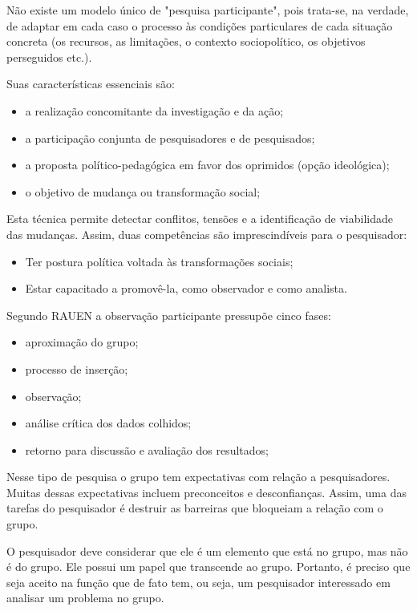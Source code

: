 Não existe um modelo único de "pesquisa participante", pois trata-se, na verdade, de adaptar em cada caso o processo às condições particulares de cada situação concreta (os recursos, as limitações, o contexto sociopolítico, os objetivos perseguidos etc.).

Suas características essenciais são:

\begin{itemize}
	\item a realização concomitante da investigação e da ação;
	\item a participação conjunta de pesquisadores e de pesquisados;
	\item a proposta político-pedagógica em favor dos oprimidos (opção ideológica);
	\item o objetivo de mudança ou transformação social;
\end{itemize}

Esta técnica permite detectar conflitos, tensões e a identificação de viabilidade das mudanças. Assim, duas competências são imprescindíveis para o pesquisador:

\begin{itemize}
	\item Ter postura política voltada às transformações sociais; 
	\item Estar capacitado a promovê-la, como observador e como analista.
\end{itemize}

Segundo RAUEN a observação participante pressupõe cinco fases:

\begin{itemize}
	\item aproximação do grupo;
	\item processo de inserção;
	\item observação;
	\item análise crítica dos dados colhidos;
	\item retorno para discussão e avaliação dos resultados;
\end{itemize}

Nesse tipo de pesquisa o grupo tem expectativas com relação a pesquisadores. Muitas dessas expectativas incluem preconceitos e desconfianças. Assim, uma das tarefas do pesquisador é destruir as barreiras que bloqueiam a relação com o grupo.

O pesquisador deve considerar que ele é um elemento que está no grupo, mas não é do grupo. Ele possui um papel que transcende ao grupo. Portanto, é preciso que seja aceito na função que de fato tem, ou seja, um pesquisador interessado em analisar um problema no grupo.

